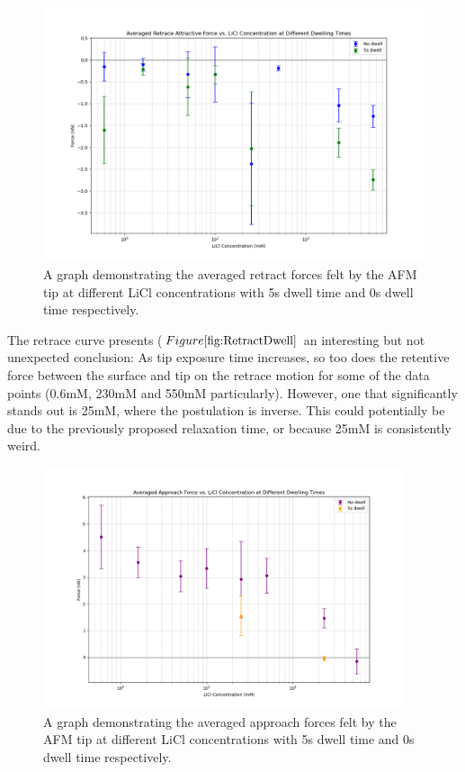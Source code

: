 \begin{figure}[h!]
\centering
\includegraphics[width=\textwidth]{chapter7/Dwell/Retrace overall.png}
\caption{A graph demonstrating the averaged retract forces felt by the AFM tip at different LiCl concentrations with 5s dwell time and 0s dwell time respectively.}
\label{fig:RetractDwell}
\end{figure}

The retrace curve presents ($Figure \ref{fig:RetractDwell}$ an interesting but not unexpected conclusion: As tip exposure time increases, so too does the retentive force between the surface and tip on the retrace motion for some of the data points (0.6mM, 230mM and 550mM particularly). However, one that significantly stands out is 25mM, where the postulation is inverse. This could potentially be due to the previously proposed relaxation time, or because 25mM is consistently weird.

\begin{figure}[h!]
\centering
\includegraphics[width=0.95\textwidth]{chapter7/Dwell/Approach overall.png}
\caption{A graph demonstrating the averaged approach forces felt by the AFM tip at different LiCl concentrations with 5s dwell time and 0s dwell time respectively.}
\label{fig:ApproachDwell}
\end{figure}

